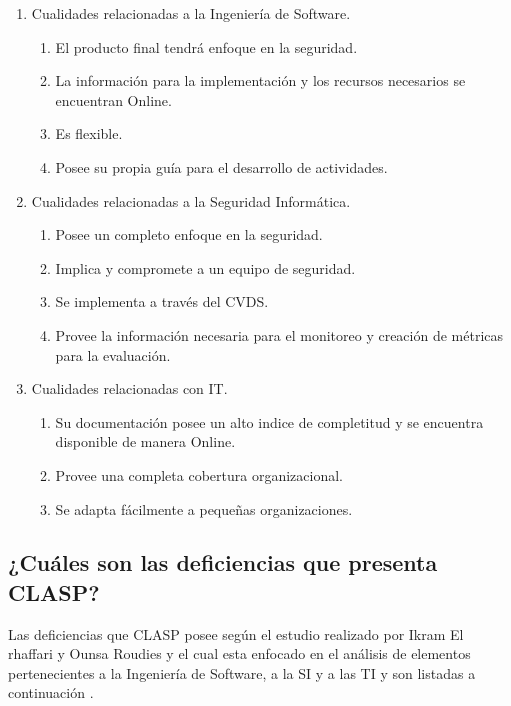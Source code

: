 \documentclass[runningheads,a4paper]{llncs}
\begin{document}
\begin{enumerate}
	\item Cualidades relacionadas a la Ingeniería de \gls{Software}.
		\begin{enumerate}
			\item El producto final tendrá enfoque en la seguridad.
			\item La información para la implementación y los recursos necesarios se encuentran \gls{Online}.
			\item Es flexible.
			\item Posee su propia guía para el desarrollo de actividades.\\
			
		\end{enumerate}
	\item Cualidades relacionadas a la Seguridad Informática.
		\begin{enumerate}
			\item Posee un completo enfoque en la seguridad.
			\item Implica y compromete a un equipo de seguridad.
			\item Se implementa a través del \gls{CVDS}.
			\item Provee la información necesaria para el monitoreo y creación de métricas para la evaluación.\\
		\end{enumerate}
	\item Cualidades relacionadas con \gls{IT}.
		\begin{enumerate}
			\item Su documentación posee un alto indice de completitud y se encuentra disponible de manera \gls{Online}.
			\item Provee una completa cobertura organizacional.
			\item Se adapta fácilmente a pequeñas organizaciones.
		\end{enumerate}
\end{enumerate}

\subsection{¿Cuáles son las deficiencias que presenta \gls{CLASP}?}
Las deficiencias que \gls{CLASP} posee según el estudio realizado por Ikram El rhaffari y Ounsa Roudies y el cual esta enfocado en el análisis de elementos pertenecientes a la Ingeniería de \gls{Software}, a la \gls{SI} y a las \gls{TI} y son listadas a continuación \cite{BenchmarkingSDLCLAPS}. 
\end{document}
